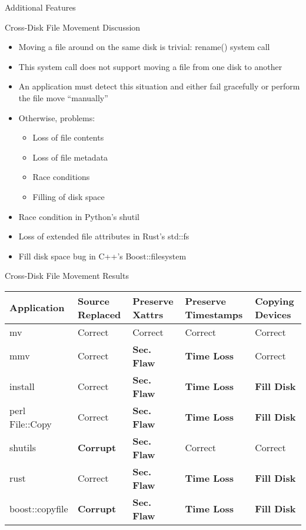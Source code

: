 \documentclass[pdf]{beamer}
\begin{document}
\begin{frame}{Additional Features}
\begin{itemize}
\begin{frame}{Cross-Disk File Movement Discussion}
  \begin{itemize}
  \item{Moving a file around on the same disk is trivial: rename() system
      call}
  \item{This system call does not support moving a file from one disk to
      another}
  \item{An application must detect this situation and either fail
      gracefully or perform the file move ``manually''}
  \item{Otherwise, problems:}
    \begin{itemize}
    \item{Loss of file contents}
    \item{Loss of file metadata}
    \item{Race conditions}
    \item{Filling of disk space}
    \end{itemize}
  \item{Race condition in Python's shutil}
  \item{Loss of extended file attributes in Rust's std::fs}
  \item{Fill disk space bug in C++'s Boost::filesystem}
  \end{itemize}
\end{frame}


\begin{frame}{Cross-Disk File Movement Results}
  \tiny{}
    \begin{tabular}{l p{1cm} p{1cm} p{1.2cm} p{1cm}}
        Application     & Source Replaced & Preserve Xattrs & Preserve Timestamps & Copying Devices\\
\hline
        mv              & Correct             & Correct         & Correct             & Correct\\
        mmv             & Correct             & {\bf Sec. Flaw} & {\bf Time
Loss} & Correct\\
        install         & Correct             & {\bf Sec. Flaw} & {\bf Time
Loss} & {\bf Fill Disk} \\
        perl File::Copy & Correct             & {\bf Sec. Flaw} & {\bf Time
Loss} & {\bf Fill Disk} \\
        shutils         & {\bf Corrupt}	& {\bf Sec. Flaw} 	& Correct             & Correct\\
        rust            & Correct             & {\bf Sec. Flaw} & {\bf Time
Loss} & {\bf Fill Disk} \\
        boost::copyfile & {\bf Corrupt}	      & {\bf Sec. Flaw} & {\bf Time
Loss} & {\bf Fill Disk} \\
    \end{tabular}
\end{frame}



\end{itemize}
\end{frame}
\end{document}
